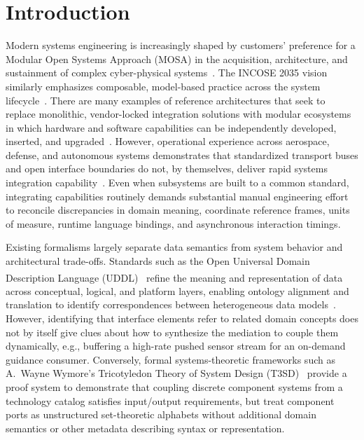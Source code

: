 \section{Introduction} \label{sec:intro}

Modern systems engineering is increasingly shaped by customers' preference for a Modular Open Systems Approach (MOSA) in the acquisition, architecture, and sustainment of complex cyber-physical systems~\cite{esper2019modular, zimmerman2019considerations}.  The INCOSE 2035 vision similarly emphasizes composable, model-based practice across the system lifecycle~\cite{INCOSE2035}.  There are many examples of reference architectures that seek to replace monolithic, vendor-locked integration solutions with modular ecosystems in which hardware and software capabilities can be independently developed, inserted, and upgraded~\cite{OpenGroup2023FACE, SOSAConsortium2023, esper2019modular, tokar2017osa}.  However, operational experience across aerospace, defense, and autonomous systems demonstrates that standardized transport buses and open interface boundaries do not, by themselves, deliver rapid systems integration capability~\cite{madni2014system}.  Even when subsystems are built to a common standard, integrating capabilities routinely demands substantial manual engineering effort to reconcile discrepancies in domain meaning, coordinate reference frames, units of measure, runtime language bindings, and asynchronous interaction timings.

Existing formalisms largely separate data semantics from system behavior and architectural trade-offs.  Standards such as the Open Universal Domain Description Language (UDDL)\textsuperscript{\textregistered}~\cite{OpenGroup2023UDDL} refine the meaning and representation of data across conceptual, logical, and platform layers, enabling ontology alignment and translation to identify correspondences between heterogeneous data models~\cite{mckibben2026alignment, mckibben2026nearring}.  However, identifying that interface elements refer to related domain concepts does not by itself give clues about how to synthesize the mediation to couple them dynamically, e.g., buffering a high-rate pushed sensor stream for an on-demand guidance consumer.  Conversely, formal systems-theoretic frameworks such as A.~Wayne Wymore's Tricotyledon Theory of System Design (T3SD)~\cite{Wymore1993} provide a proof system to demonstrate that coupling discrete component systems from a technology catalog satisfies input/output requirements, but treat component ports as unstructured set-theoretic alphabets without additional domain semantics or other metadata describing syntax or representation.

